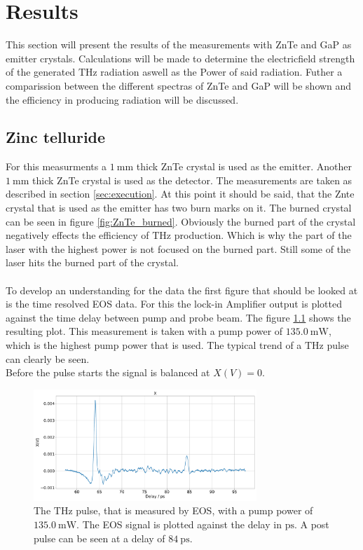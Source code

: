 \chapter{Results}
This section will present the results of the measurements with ZnTe and GaP as emitter crystals.
Calculations will be made to determine the electricfield strength of the generated $\si{\tera\hertz}$ radiation aswell as the Power of said radiation.
Futher a comparission between the different spectras of ZnTe and GaP will be shown and the efficiency in producing radiation will be discussed.

\section{Zinc telluride}
For this measurments a $\SI{1}{\milli\meter}$ thick ZnTe crystal is used as the emitter.
Another $\SI{1}{\milli\meter}$ thick ZnTe crystal is used as the detector.
The measurements are taken as described in section \ref{sec:execution}.
At this point it should be said, that the Znte crystal that is used as the emitter has two burn marks on it.
The burned crystal can be seen in figure \ref{fig:ZnTe_burned}.
Obviously the burned part of the crystal negatively effects the efficiency of $\si{\tera\hertz}$ production.
Which is why the part of the laser with the highest power is not focused on the burned part.
Still some of the laser hits the burned part of the crystal.
\\\\
To develop an understanding for the data the first figure that should be looked at is the time resolved EOS data.
For this the lock-in Amplifier output is plotted against the time delay between pump and probe beam.
The figure \ref{ZnTe:2_11_30_20_signal} shows the resulting plot.
This measurement is taken with a pump power of $\SI{135.0}{\milli\W}$, which is the highest pump power that is used.
The typical trend of a $\si{\tera\hertz}$ pulse can clearly be seen.
\\
Before the pulse starts the signal is balanced at $X(V)=0$.
\begin{figure}
    \centering
    \includegraphics[width=0.75\textwidth]{Plots/2_11_30_20normalX.pdf}
    \caption{The $\si{\tera\hertz}$ pulse, that is measured by EOS, with a pump power of $\SI{135.0}{\milli\W}$.
    The EOS signal is plotted against the delay in $\si{\pico\second}$.
    A post pulse can be seen at a delay of $\SI{84}{\pico\second}$.}
    \label{ZnTe:2_11_30_20_signal}
\end{figure}
